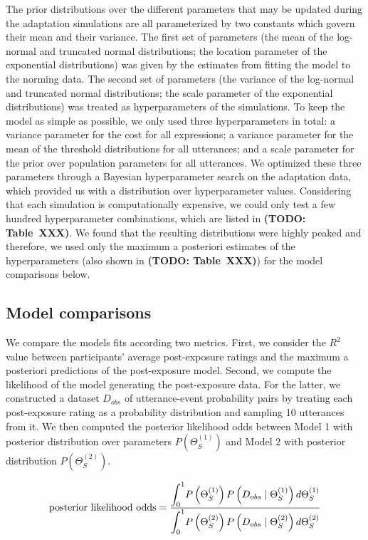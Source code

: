 \documentclass[lucida,biblatex]{sp} %
\newcommand{\todo}[1]{}
\renewcommand{\todo}[1]{{\bf \color{red} (TODO: {#1})}}
\begin{document}
The prior distributions over the different parameters that may be updated during the adaptation simulations are all parameterized by two constants which govern their mean and their variance. The first set of parameters (the mean of the log-normal and truncated normal distributions; the location parameter of the exponential distributions) was given by the estimates from fitting the model to the norming data. The second set of parameters (the variance of the log-normal and truncated normal distributions; the scale parameter of the exponential distributions) was treated as hyperparameters of the simulations. To keep the model as simple as possible, we only used three hyperparameters in total: a variance parameter for the cost for all expressions; a variance parameter for the mean of the threshold distributions for all utterances; and a scale parameter for the prior over population parameters for all utterances. We optimized these three parameters through a Bayesian hyperparameter search on the adaptation data, which provided us with a distribution over hyperparameter values. Considering that each simulation is computationally expensive, we could only test a few hundred hyperparameter combinations, which are listed in \todo{Table~XXX}. We found that the resulting distributions were highly peaked and therefore, we used only the maximum a posteriori estimates of the hyperparameters (also shown in \todo{Table~XXX}) for the model comparisons below.


\subsection{Model comparisons}

We compare the models fits according two metrics. First, we consider the $R^2$ value between participants' average post-exposure ratings and the maximum a posteriori predictions of the post-exposure model. Second, we compute the likelihood of the model generating the post-exposure data. For the latter, we constructed a dataset $D_{obs}$ of utterance-event probability pairs by treating each post-exposure rating as a probability distribution and sampling 10 utterances from it. We then computed the posterior likelihood odds between Model 1 with posterior distribution over parameters $P(\Theta_{S}^{(1)})$ and Model 2 with posterior distribution $P(\Theta_{S}^{(2)})$.

$$\mbox{posterior likelihood odds} = \frac{\mathlarger{\int_0^1} {P\left(\Theta_{S}^{(1)}\right) P\left(D_{obs} \mid \Theta_{S}^{(1)} \right) d   \Theta_{S}^{(1)}}}{\mathlarger{\int_0^1} P\left(\Theta_{S}^{(2)}\right) P\left(D_{obs} \mid \Theta_{S}^{(2)}\right)d   \Theta_{S}^{(2)} }$$
 
\end{document}
